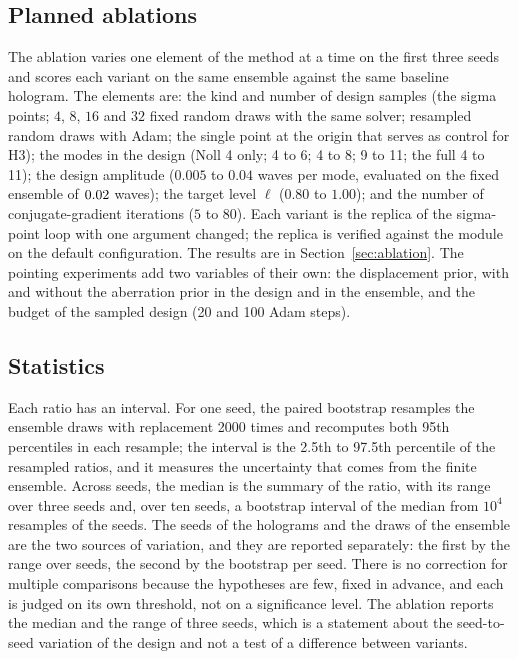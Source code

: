 \subsection{Planned ablations}

The ablation varies one element of the method at a time on the first three seeds and scores each variant on the same ensemble against the same baseline hologram. The elements are: the kind and number of design samples (the sigma points; $4$, $8$, $16$ and $32$ fixed random draws with the same solver; resampled random draws with Adam; the single point at the origin that serves as control for H3); the modes in the design (Noll 4 only; 4 to 6; 4 to 8; 9 to 11; the full 4 to 11);
the design amplitude ($0.005$ to $0.04$ waves per mode, evaluated on the fixed ensemble of $0.02$ waves); the target level $\ell$ ($0.80$ to $1.00$); and the number of conjugate-gradient iterations ($5$ to $80$). Each variant is the replica of the sigma-point loop with one argument changed; the replica is verified against the module on the default configuration. The results are in Section~\ref{sec:ablation}. The pointing experiments add two variables of their own: the displacement prior, with and without the aberration prior in the design and in the ensemble, and the budget of the sampled design (20 and 100 Adam steps).

\subsection{Statistics}

Each ratio has an interval. For one seed, the paired bootstrap resamples the ensemble draws with replacement 2000 times and recomputes both 95th percentiles in each resample; the interval is the 2.5th to 97.5th percentile of the resampled ratios, and it measures the uncertainty that comes from the finite ensemble. Across seeds, the median is the summary of the ratio, with its range over three seeds and, over ten seeds, a bootstrap interval of the median from $10^4$ resamples of the seeds.
The seeds of the holograms and the draws of the ensemble are the two sources of variation, and they are reported separately: the first by the range over seeds, the second by the bootstrap per seed. There is no correction for multiple comparisons because the hypotheses are few, fixed in advance, and each is judged on its own threshold, not on a significance level. The ablation reports the median and the range of three seeds, which is a statement about the seed-to-seed
variation of the design and not a test of a difference between variants.
